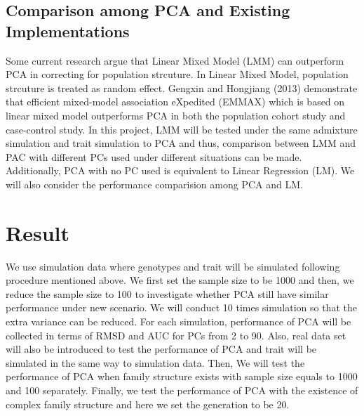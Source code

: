 \documentclass[12pt]{article}
\begin{document}
\subsection{Comparison among PCA and Existing Implementations }

Some current research argue that Linear Mixed Model (LMM) can outperform PCA in correcting for population strcuture. In Linear Mixed Model, population strcuture is treated as random effect. Gengxin and Hongjiang (2013) demonstrate that efficient
mixed-model association eXpedited (EMMAX) which is based on linear mixed model outperforms PCA in both the population cohort study and case-control study. In this project, LMM will be tested under the same admixture simulation and trait simulation to PCA and thus, comparison between LMM and PAC with different PCs used under different situations can be made. Additionally, PCA with no PC used is equivalent to Linear Regression (LM). We will also consider the performance comparision among PCA and LM. 



\section{Result}

We use simulation data where genotypes and trait will be simulated following procedure mentioned above. We first set the sample size to be 1000 and then, we reduce the sample size to 100 to investigate whether PCA still have similar performance under new scenario. We will conduct 10 times simulation so that the extra variance can be reduced. For each simulation, performance of PCA will be collected in terms of RMSD and AUC for PCs from 2 to 90. Also, real data set will also be introduced to test the performance of PCA and trait will be simulated in the same way to simulation data. Then, We will test the performance of PCA when family structure exists with sample size equals to 1000 and 100 separately. Finally, we test the performance of PCA with the existence of complex family structure and here we set the generation to be 20.
\end{document}
